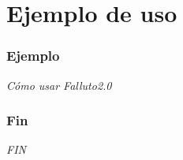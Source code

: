 \documentclass[serif]{beamer}
\begin{document}
\section[Ejemplo]{Ejemplo de uso}
\begin{frame}
\frametitle{Ejemplo}
\begin{center}{\LARGE \emph{Cómo usar Falluto2.0}}\end{center}
\end{frame}




\begin{frame}
\frametitle{Fin}
\begin{center}{\LARGE \emph{FIN}}\end{center}
\end{frame}


\end{document}
